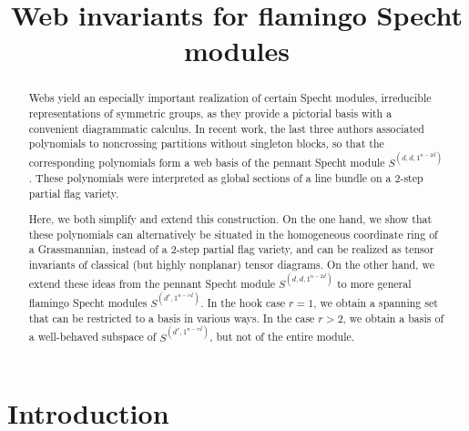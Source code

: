 \documentclass[ALCO, Unicode]{cedram}
\title{Web invariants for flamingo Specht modules}
\author[\initial{C.} Fraser]{\firstname{Chris} \lastname{Fraser}}
\author[\initial{R.} Patrias]{\firstname{Rebecca} \lastname{Patrias}}
\author[\initial{O.} Pechenik]{\firstname{Oliver} \lastname{Pechenik}}
\author[\initial{J.} Striker]{\firstname{Jessica}\nobreakauthor\lastname{Striker}}
\numberwithin{equation}{section}
\begin{document}
\begin{abstract}
Webs yield an especially important realization of certain Specht modules, irreducible representations of symmetric groups, as they provide a pictorial basis with a convenient diagrammatic calculus. In recent work, the last three authors associated polynomials to noncrossing partitions without singleton blocks, so that the corresponding polynomials form a web basis of the pennant Specht module $S^{(d,d,1^{n-2d})}$. These polynomials were interpreted as global sections of a line bundle on a $2$-step partial flag variety. 

Here, we both simplify and extend this construction. On the one hand, we show that these polynomials can alternatively be situated in the homogeneous coordinate ring of a Grassmannian, instead of a $2$-step partial flag variety, and can be realized as tensor invariants of classical (but highly nonplanar) tensor diagrams. On the other hand, we extend these ideas from the pennant Specht module $S^{(d,d,1^{n-2d})}$ to more general flamingo Specht modules $S^{(d^r,1^{n-rd})}$. In the hook case $r=1$, we obtain a spanning set that can be restricted to a basis in various ways. In the case $r>2$, we obtain a basis of a well-behaved subspace of $S^{(d^r,1^{n-rd})}$, but not of the entire module.
\end{abstract}

\maketitle


\section{Introduction}\label{sec:intro}
\end{document}
